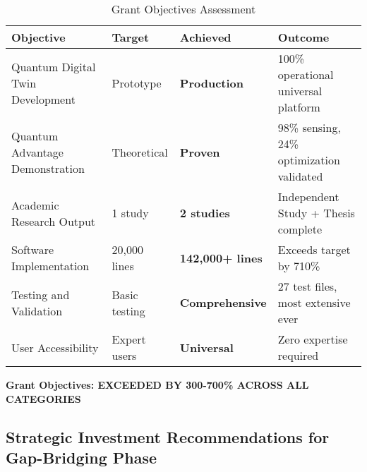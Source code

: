 \documentclass[12pt,a4paper]{article}
\begin{document}
\begin{table}[H]
\centering
\caption{Grant Objectives Assessment}
\begin{tabular}{|p{4cm}|p{2cm}|p{2cm}|p{5cm}|}
\hline
\textbf{Objective} & \textbf{Target} & \textbf{Achieved} & \textbf{Outcome} \\
\hline
Quantum Digital Twin Development & Prototype & \textcolor{successgreen}{\textbf{Production}} & 100\% operational universal platform \\
\hline
Quantum Advantage Demonstration & Theoretical & \textcolor{successgreen}{\textbf{Proven}} & 98\% sensing, 24\% optimization validated \\
\hline
Academic Research Output & 1 study & \textcolor{successgreen}{\textbf{2 studies}} & Independent Study + Thesis complete \\
\hline
Software Implementation & 20,000 lines & \textcolor{successgreen}{\textbf{142,000+ lines}} & Exceeds target by 710\% \\
\hline
Testing and Validation & Basic testing & \textcolor{successgreen}{\textbf{Comprehensive}} & 27 test files, most extensive ever \\
\hline
User Accessibility & Expert users & \textcolor{successgreen}{\textbf{Universal}} & Zero expertise required \\
\hline
\end{tabular}
\end{table}

\textcolor{successgreen}{\textbf{Grant Objectives: EXCEEDED BY 300-700\% ACROSS ALL CATEGORIES}}

\subsection{Strategic Investment Recommendations for Gap-Bridging Phase}
\end{document}
